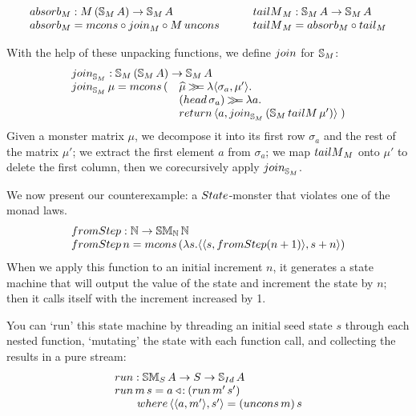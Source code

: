 $$
\begin{array}{l}
\absorb_M : M\,(\stream{M}\,A) \rightarrow \stream{M}\,A \\
\absorb_M =  \mcons \comp \join_{M} \comp M\,\uncons
\end{array}
  \qquad
\begin{array}{l}
\tailm_M : \stream{M}\,A \rightarrow \stream{M}\,A \\
\tailm_M = \absorb_M \comp \tail_M
\end{array}
$$

With the help of these unpacking functions, we define $\join$ for ${\mathbb{S}_{M}}$:
$$
\begin{array}{ll}
\multicolumn{2}{l}{\join_{\stream{M}}: \stream{M}\,(\stream{M}\,A) \rightarrow \stream{M}\,A}\\
\join_{\stream{M}}\,\mu = \mcons\,(
  & \unc{\mu} \bind
    \lambda \pair{\sigma_a}{\mu'}.\\
  &  (\head\,\sigma_a) \bind \lambda a.\\
  & \return\,\pair{a}{\join_{\stream{M}}\,(\stream{M}\,\tailm\, \mu')} \; )
\end{array}
$$
Given a monster matrix $\mu$, we decompose it into its first row $\sigma_a$ and the rest of the matrix $\mu'$; 
we extract the first element $a$ from $\sigma_a$;
we map $\tailm_M$ onto $\mu'$ to delete the first column, then we corecursively apply $\join_{\stream{M}}$.

We now present our counterexample: a $\state$-monster that violates one of the monad laws.
$$
\begin{array}{l}
\fromstepstr : \nat \rightarrow \stmon{\nat}\,\nat \\
\fromstepstr\, n = \mcons\, (\lambda s. \pair{\pair{s}{\fromstepstr (n + 1)}}{s + n})
\end{array}
$$
When we apply this function to an initial increment $n$, it generates a state machine that will output the value of the state and increment the state by $n$; then it calls itself with the increment increased by 1.

You can `run' this state machine by threading an initial seed state $s$ through each nested function, `mutating' the state with each function call, and collecting the results in a pure stream:
$$
\begin{array}{l}
\strun : \stmon{S}\,A \rightarrow S \rightarrow \stream{\Id}\,A  \\
\strun\, m\, s = a \acons (\strun\,m'\,s')  \\
\qquad\where\,\pair{\pair{a}{m'}}{s'} = (\uncons\,m)\, s
\end{array}
$$

